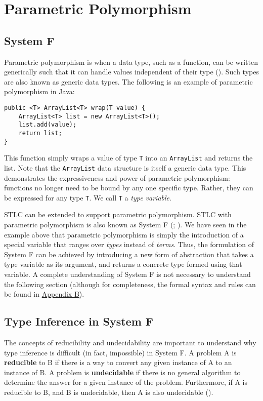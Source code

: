 \section{Parametric Polymorphism}

\subsection{System F}

Parametric polymorphism is when a data type, such as a function, can be written generically such that it can handle values independent of their type (\cite{pierce}). Such types are also known as generic data types. The following is an example of parametric polymorphism in Java:
\begin{lstlisting}[label=lst:GenProg,caption=Generic Programming in Java]
public <T> ArrayList<T> wrap(T value) {
    ArrayList<T> list = new ArrayList<T>();
    list.add(value);
    return list;
}
\end{lstlisting}
This function simply wraps a value of type \texttt{T} into an \texttt{ArrayList} and returns the list. Note that the \texttt{ArrayList} data structure is itself a generic data type. This demonstrates the expressiveness and power of parametric polymorphism: functions no longer need to be bound by any one specific type. Rather, they can be expressed for any type \texttt{T}. We call \texttt{T} a \textit{type variable}.

STLC can be extended to support parametric polymorphism. STLC with parametric polymorphism is also known as System F (\cite{girard}; \cite{reynolds}). We have seen in the example above that parametric polymorphism is simply the introduction of a special variable that ranges over \textit{types} instead of \textit{terms}. Thus, the formulation of System F can be achieved by introducing a new form of abstraction that takes a type variable as its argument, and returns a concrete type formed using that variable. A complete understanding of System F is not necessary to understand the following section (although for completeness, the formal syntax and rules can be found in \hyperref[sec:AppB]{Appendix B}).

\subsection{Type Inference in System F}

The concepts of reducibility and undecidability are important to understand why type inference is difficult (in fact, impossible) in System F. A problem A is \textbf{reducible} to B if there is a way to convert any given instance of A to an instance of B. A problem is \textbf{undecidable} if there is no general algorithm to determine the answer for a given instance of the problem. Furthermore, if A is reducible to B, and B is undecidable, then A is also undecidable (\cite{hopcroft}).

